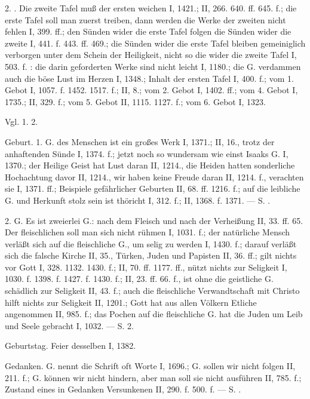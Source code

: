 2. . Die zweite Tafel muß der ersten weichen I, 1421.; II, 266. 640. ff. 645. f.; die erste Tafel soll man zuerst treiben, dann werden die Werke der zweiten nicht fehlen I, 399. ff.; den Sünden wider die erste Tafel folgen die Sünden wider die zweite I, 441. f. 443. ff. 469.; die Sünden wider die erste Tafel bleiben gemeiniglich verborgen unter dem Schein der Heiligkeit, nicht so die wider die zweite Tafel I, 503. f. : die darin geforderten Werke sind nicht leicht I, 1180.; die G. verdammen auch die böse Lust im Herzen I, 1348.; Inhalt der ersten Tafel I, 400. f.; vom 1. Gebot I, 1057. f. 1452. 1517. f.; II, 8.; vom 2. Gebot I, 1402. ff.; vom 4. Gebot I, 1735.; II, 329. f.; vom 5. Gebot II, 1115. 1127. f.; vom 6. Gebot I, 1323.

Vgl.  1. 2.

Geburt. 1.  G. des Menschen ist ein großes Werk I, 1371.; II, 16., trotz der anhaftenden Sünde I, 1374. f.; jetzt noch so wundersam wie einst Isaaks G. I, 1370.; der Heilige Geist hat Lust daran II, 1214., die Heiden hatten sonderliche Hochachtung davor II, 1214., wir haben keine Freude daran II, 1214. f., verachten sie I, 1371. ff.; Beispiele gefährlicher Geburten
II, 68. ff. 1216. f.; auf die leibliche G. und Herkunft stolz sein ist thöricht I, 312. f.; II, 1368. f. 1371. — S. .

2.  G. Es ist zweierlei G.: nach dem Fleisch und nach der Verheißung II, 33. ff. 65. Der fleischlichen soll man sich nicht rühmen I, 1031. f.; der natürliche Mensch verläßt sich auf die fleischliche G., um selig zu werden I, 1430. f.; darauf verläßt sich die falsche Kirche II, 35., Türken, Juden und Papisten II, 36. ff.; gilt nichts vor Gott I, 328. 1132. 1430. f.; II, 70. ff. 1177. ff., nützt nichts zur Seligkeit I, 1030. f. 1398. f. 1427. f. 1430. f.; II, 23. ff. 66. f., ist ohne die geistliche G. schädlich zur Seligkeit II, 43. f.; auch die fleischliche Verwandtschaft mit Christo hilft nichts zur Seligkeit II, 1201.; Gott hat aus allen Völkern Etliche angenommen II, 985. f.; das Pochen auf die fleischliche G. hat die Juden um Leib und Seele gebracht I, 1032. — S.  2.

Geburtstag. Feier desselben I, 1382.

Gedanken. G. nennt die Schrift oft Worte I, 1696.;  G. sollen wir nicht folgen II, 211. f.;  G. können wir nicht hindern, aber man soll sie nicht ausführen II, 785. f.; Zustand eines in Gedanken Versunkenen II, 290. f. 500. f. — S. .

